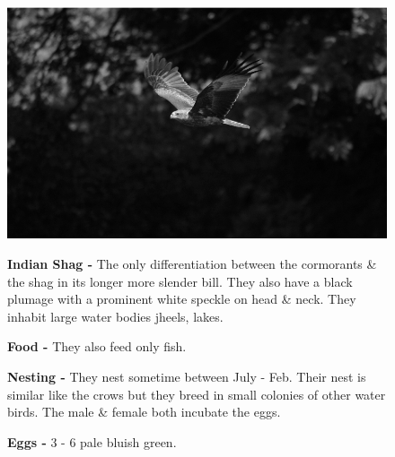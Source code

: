 \begin{figure}[H]
\begin{center}
\includegraphics{figure/Land_birds/01_pariah_kite/pariah-kite.eps}
\end{center}
\medskip
\noindent
{\bf Indian Shag -} The only differentiation between the cormorants \& the shag in its longer more slender bill. They also have a black plumage with a prominent white speckle on head \& neck. They inhabit large water bodies jheels, lakes.

\medskip
{\bf Food -} They also feed only fish.

{\bf Nesting -} They nest sometime between July - Feb. Their nest is similar like the crows but they breed in small colonies of other water birds. The male \& female both incubate the eggs. 

{\bf Eggs -} 3 - 6 pale bluish green.
\end{figure}

\vfill\eject

~\phantom{a}
\vfill

